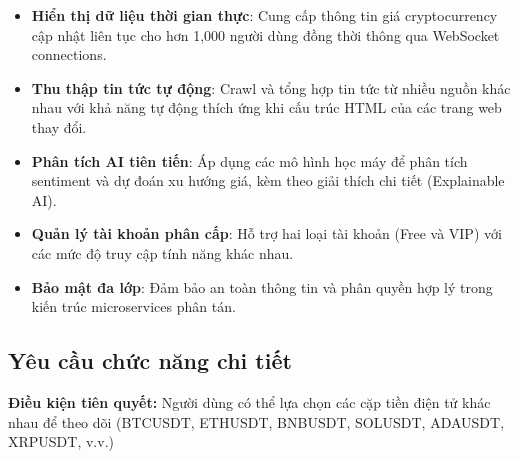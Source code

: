 \begin{itemize}
    \item \textbf{Hiển thị dữ liệu thời gian thực}: Cung cấp thông tin giá cryptocurrency cập nhật liên tục cho hơn 1,000 người dùng đồng thời thông qua WebSocket connections.
    
    \item \textbf{Thu thập tin tức tự động}: Crawl và tổng hợp tin tức từ nhiều nguồn khác nhau với khả năng tự động thích ứng khi cấu trúc HTML của các trang web thay đổi.
    
    \item \textbf{Phân tích AI tiên tiến}: Áp dụng các mô hình học máy để phân tích sentiment và dự đoán xu hướng giá, kèm theo giải thích chi tiết (Explainable AI).
    
    \item \textbf{Quản lý tài khoản phân cấp}: Hỗ trợ hai loại tài khoản (Free và VIP) với các mức độ truy cập tính năng khác nhau.
    
    \item \textbf{Bảo mật đa lớp}: Đảm bảo an toàn thông tin và phân quyền hợp lý trong kiến trúc microservices phân tán.
\end{itemize}

\subsection*{Yêu cầu chức năng chi tiết}

\begin{mybox}
\textbf{Điều kiện tiên quyết:} Người dùng có thể lựa chọn các cặp tiền điện tử khác nhau để theo dõi (BTCUSDT, ETHUSDT, BNBUSDT, SOLUSDT, ADAUSDT, XRPUSDT, v.v.)
\end{mybox}

